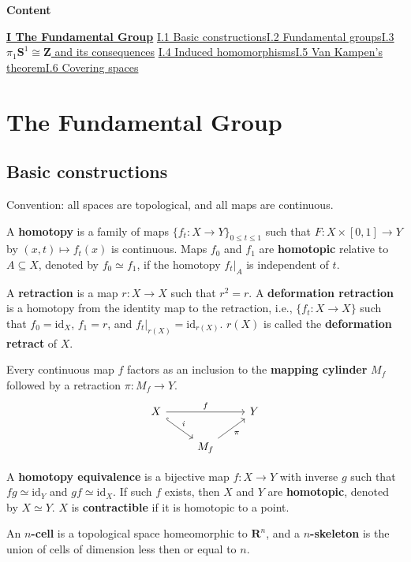 \documentclass[11pt]{article}
\newcommand{\forceindent}{\leavevmode{\parindent=1.5em\indent}}
\theoremstyle{definition}
\theoremstyle{plain}
\theoremstyle{remark}
\newcommand{\id}{\textrm{id}}
\newcommand{\R}{\mathbf{R}}
\newcommand{\Z}{\mathbf{Z}}
\begin{document}
\textbf{\Large{Content}}\bigbreak

\hyperref[1]{\textbf{I The Fundamental Group}}\newline
\forceindent\hyperref[2]{I.1 Basic constructions}\quad\hyperref[3]{I.2 Fundamental groups}\quad\hyperref[4]{I.3 $\pi_1\mathbf{S}^1\cong\Z$ and its consequences}\newline
\forceindent\hyperref[6]{I.4 Induced homomorphisms}\quad\hyperref[7]{I.5 Van Kampen's theorem}\quad\hyperref[8]{I.6 Covering spaces}

\newpage
\section{The Fundamental Group}\label{1}

\subsection{Basic constructions}\label{2}

Convention: all spaces are topological, and all maps are continuous.\medbreak

A \textbf{homotopy} is a family of maps $\{f_t:X\to Y\}_{0\leq t\leq1}$ such that $F:X\times[0,1]\to Y$ by $(x,t)\mapsto f_t(x)$ is continuous. Maps $f_0$ and $f_1$ are \textbf{homotopic} relative to $A\subseteq X$, denoted by $f_0\simeq f_1$, if the homotopy $f_t|_A$ is independent of $t$.\medbreak

A \textbf{retraction} is a map $r:X\to X$ such that $r^2=r$. A \textbf{deformation retraction} is a homotopy from the identity map to the retraction, i.e., $\{f_t:X\to X\}$ such that $f_0=\id_X$, $f_1=r$, and $f_t|_{r(X)}=\id_{r(X)}$. $r(X)$ is called the \textbf{deformation retract} of $X$.\medbreak

Every continuous map $f$ factors as an inclusion to the \textbf{mapping cylinder} $M_f$ followed by a retraction $\pi:M_f\to Y$.
\[\begin{tikzcd}
X\arrow[hookrightarrow]{dr}{i}\arrow{rr}{f}&&Y\\
&M_f\arrow[swap]{ur}{\pi}
\end{tikzcd}\]\medbreak

A \textbf{homotopy equivalence} is a bijective map $f:X\to Y$ with inverse $g$ such that $fg\simeq\id_Y$ and $gf\simeq\id_X$. If such $f$ exists, then $X$ and $Y$ are \textbf{homotopic}, denoted by $X\simeq Y$. $X$ is \textbf{contractible} if it is homotopic to a point.\medbreak

An \textbf{$n$-cell} is a topological space homeomorphic to $\R^n$, and a \textbf{$n$-skeleton} is the union of cells of dimension less then or equal to $n$.\medbreak
\end{document}
